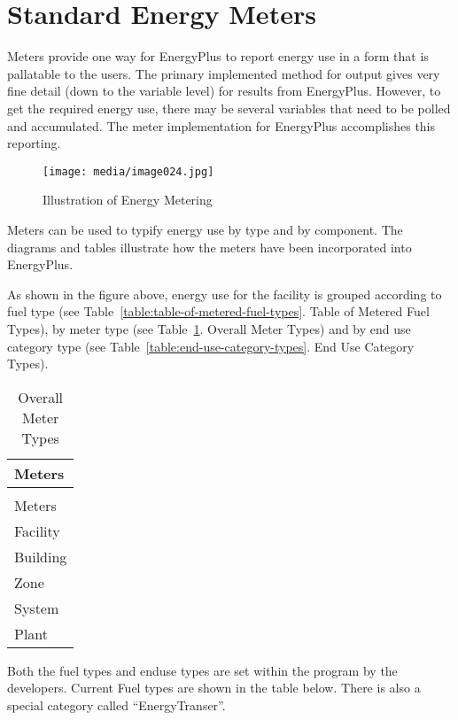 \section{Standard Energy Meters}\label{standard-energy-meters}

Meters provide one way for EnergyPlus to report energy use in a form that is pallatable to the users. The primary implemented method for output gives very fine detail (down to the variable level) for results from EnergyPlus. However, to get the required energy use, there may be several variables that need to be polled and accumulated. The meter implementation for EnergyPlus accomplishes this reporting.

\begin{figure}[hbtp] %
\centering
\texttt{[image: media/image024.jpg]}
\caption{Illustration of Energy Metering \protect \label{fig:illustration-of-energy-metering}}
\end{figure}

Meters can be used to typify energy use by type and by component. The diagrams and tables illustrate how the meters have been incorporated into EnergyPlus.

As shown in the figure above, energy use for the facility is grouped according to fuel type (see Table~\ref{table:table-of-metered-fuel-types}. Table of Metered Fuel Types), by meter type (see Table~\ref{table:overall-meter-types}. Overall Meter Types) and by end use category type (see Table~\ref{table:end-use-category-types}. End Use Category Types).

\begin{longtable}[c]{@{}l@{}}
\caption{Overall Meter Types \label{table:overall-meter-types}} \tabularnewline
\toprule 
Meters \tabularnewline
\midrule
\endfirsthead

\caption[]{Overall Meter Types} \tabularnewline
\toprule 
Meters \tabularnewline
\midrule
\endhead

Facility \tabularnewline
Building \tabularnewline
Zone \tabularnewline
System \tabularnewline
Plant \tabularnewline
\bottomrule
\end{longtable}

Both the fuel types and enduse types are set within the program by the developers. Current Fuel types are shown in the table below. There is also a special category called ``EnergyTranser''.

